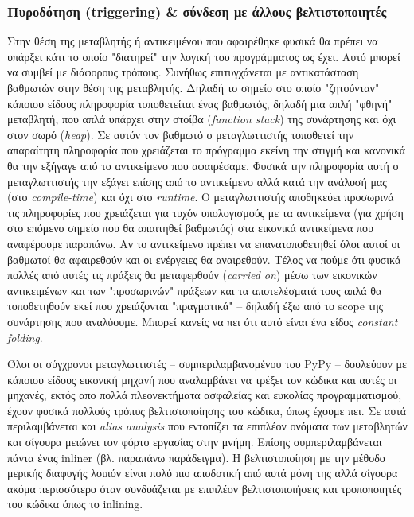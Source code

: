 
\subsubsection{Πυροδότηση (triggering) \& σύνδεση με άλλους βελτιστοποιητές}

Στην θέση της μεταβλητής ή αντικειμένου που αφαιρέθηκε φυσικά θα πρέπει να
υπάρξει κάτι το οποίο "διατηρεί" την λογική του προγράμματος ως έχει. Αυτό
μπορεί να συμβεί με διάφορους τρόπους. Συνήθως επιτυγχάνεται με αντικατάσταση
βαθμωτών στην θέση της μεταβλητής. Δηλαδή το σημείο στο οποίο "ζητούνταν"
κάποιου είδους πληροφορία τοποθετείται ένας βαθμωτός, δηλαδή μια απλή "φθηνή"
μεταβλητή, που απλά υπάρχει στην στοίβα (\textit{function stack}) της συνάρτησης
και όχι στον σωρό (\textit{heap}). Σε αυτόν τον βαθμωτό ο μεταγλωττιστής
τοποθετεί την απαραίτητη πληροφορία που χρειάζεται το πρόγραμμα εκείνη την
στιγμή και κανονικά θα την εξήγαγε από το αντικείμενο που αφαιρέσαμε. Φυσικά την
πληροφορία αυτή ο μεταγλωττιστής την εξάγει επίσης από το αντικείμενο αλλά κατά
την ανάλυσή μας (στο \textit{compile-time}) και όχι στο \textit{runtime}. Ο
μεταγλωττιστής αποθηκεύει προσωρινά τις πληροφορίες που χρειάζεται για τυχόν
υπολογισμούς με τα αντικείμενα (για χρήση στο επόμενο σημείο που θα απαιτηθεί
βαθμωτός) στα εικονικά αντικείμενα που αναφέρουμε παραπάνω. Αν το αντικείμενο
πρέπει να επανατοποθετηθεί όλοι αυτοί οι βαθμωτοί θα αφαιρεθούν και οι ενέργειες
θα αναιρεθούν. Τέλος να πούμε ότι φυσικά πολλές από αυτές τις πράξεις θα
μεταφερθούν (\textit{carried on}) μέσω των εικονικών αντικειμένων και των
"προσωρινών" πράξεων και τα αποτελέσματά τους απλά θα τοποθετηθούν εκεί που
χρειάζονται "πραγματικά" – δηλαδή έξω από το scope της συνάρτησης που αναλύουμε.
Μπορεί κανείς να πει ότι αυτό είναι ένα είδος \textit{constant folding}.

Όλοι οι σύγχρονοι μεταγλωττιστές – συμπεριλαμβανομένου του PyPy – δουλεύουν με
κάποιου είδους εικονική μηχανή που αναλαμβάνει να τρέξει τον κώδικα και αυτές οι
μηχανές, εκτός απο πολλά πλεονεκτήματα ασφαλείας και ευκολίας προγραμματισμού,
έχουν φυσικά πολλούς τρόπυς βελτιστοποίησης του κώδικα, όπως έχουμε πει. Σε αυτά
περιλαμβάνεται και \textit{alias analysis} που εντοπίζει τα επιπλέον ονόματα των
μεταβλητών και σίγουρα μειώνει τον φόρτο εργασίας στην μνήμη. Επίσης
συμπεριλαμβάνεται πάντα ένας inliner (βλ. παραπάνω παράδειγμα). Η βελτιστοποίηση
με την μέθοδο μερικής διαφυγής λοιπόν είναι πολύ πιο αποδοτική από αυτά μόνη της
αλλά σίγουρα ακόμα περισσότερο όταν συνδυάζεται με επιπλέον βελτιστοποιήσεις και
τροποποιητές του κώδικα όπως το inlining.

